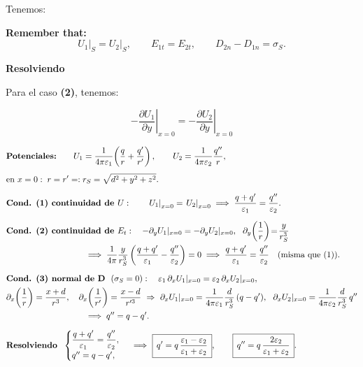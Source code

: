 \documentclass{article}
\begin{document}
Tenemos:

\textbf{Remember that:}
\[
\left. U_{1}\right|_{S} = \left. U_{2}\right|_{S},\qquad
E_{1t}=E_{2t},\qquad
D_{2n}-D_{1n}=\sigma_S.
\]

\textcolor{Apple Green}{\textbf{Resolviendo}}

Para el caso \textbf{(2)}, tenemos:

\[   \left. - \frac{ \partial U_{1} }{  \partial y } \right|_{x=0} = \left. - \frac{ \partial U_{2} }{  \partial y } \right|_{x=0}    \]

\begin{equation*}
\begin{split}
&\textbf{Potenciales:}\qquad
U_1=\frac{1}{4\pi\varepsilon_1}\!\left(\frac{q}{r}+\frac{q'}{r'}\right),\qquad
U_2=\frac{1}{4\pi\varepsilon_2}\frac{q''}{r},\\[4pt]
&\text{en } x=0:\; r=r'=:r_S=\sqrt{d^2+y^2+z^2}.
\\[6pt]
&\textbf{Cond. (1) continuidad de }U:\qquad
\left.U_1\right|_{x=0}=\left.U_2\right|_{x=0}
\;\Longrightarrow\;
\frac{q+q'}{\varepsilon_1}=\frac{q''}{\varepsilon_2}.
\\[6pt]
&\textbf{Cond. (2) continuidad de }E_t:\quad
-\partial_y U_1|_{x=0}=-\partial_y U_2|_{x=0},
\ \ \partial_y\!\left(\frac{1}{r}\right)\!=\!\frac{y}{r_S^3}
\\
&\hspace{3.3cm}\Longrightarrow\;
\frac{1}{4\pi}\frac{y}{r_S^3}
\left(\frac{q+q'}{\varepsilon_1}-\frac{q''}{\varepsilon_2}\right)=0
\;\Longrightarrow\;
\frac{q+q'}{\varepsilon_1}=\frac{q''}{\varepsilon_2} \quad(\text{misma que (1)}).
\\[6pt]
&\textbf{Cond. (3) normal de }\mathbf D\ \ (\sigma_S=0):\quad
\varepsilon_1\,\partial_x U_1|_{x=0}=\varepsilon_2\,\partial_x U_2|_{x=0},\\
&\partial_x\!\left(\frac{1}{r}\right)=\frac{x+d}{r^3},\quad
\partial_x\!\left(\frac{1}{r'}\right)=\frac{x-d}{r'^3}
\ \Rightarrow\ 
\partial_x U_1|_{x=0}
=\frac{1}{4\pi\varepsilon_1}\frac{d}{r_S^3}\,(q-q'),\ \ 
\partial_x U_2|_{x=0}
=\frac{1}{4\pi\varepsilon_2}\frac{d}{r_S^3}\,q''\\
&\hspace{3.3cm}\Longrightarrow\;
q''=q-q'.
\\[6pt]
&\textbf{Resolviendo}\ \ 
\begin{cases}
\dfrac{q+q'}{\varepsilon_1}=\dfrac{q''}{\varepsilon_2},\\
q''=q-q',
\end{cases}
\ \Longrightarrow\
\boxed{\,q' = q\,\dfrac{\varepsilon_1-\varepsilon_2}{\varepsilon_1+\varepsilon_2}\,},\qquad
\boxed{\,q''= q\,\dfrac{2\varepsilon_2}{\varepsilon_1+\varepsilon_2}\,}.
\end{split}
\end{equation*}
\end{document}
